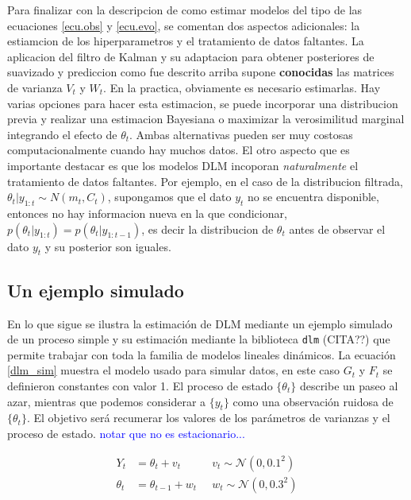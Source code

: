 \documentclass[12pt]{article}\usepackage[]{graphicx}\usepackage[]{color}
\begin{document}
Para finalizar con la descripcion de como estimar modelos del tipo de las ecuaciones \eqref{ecu.obs} y \eqref{ecu.evo}, se comentan dos aspectos adicionales: la estiamcion de los hiperparametros y el tratamiento de datos faltantes. La aplicacion del filtro de Kalman y su adaptacion para obtener posteriores de suavizado y prediccion como fue descrito arriba supone \textbf{conocidas} las matrices de varianza $V_t$ y $W_t$. En la practica, obviamente es necesario estimarlas. Hay varias opciones para hacer esta estimacion, se puede incorporar una distribucion previa y realizar una estimacion Bayesiana o maximizar la verosimilitud marginal integrando el efecto de $\theta_t$. Ambas alternativas pueden ser muy costosas computacionalmente cuando hay muchos datos. El otro aspecto que es importante destacar es que los modelos DLM incoporan \textit{naturalmente} el tratamiento de datos faltantes. Por ejemplo, en el caso de la distribucion filtrada, $\theta_t|y_{1:t} \sim N(m_t, C_t)$, supongamos que el dato $y_t$ no se encuentra disponible, entonces no hay informacion nueva en la que condicionar, $p(\theta_t|y_{1:t}) = p(\theta_t|y_{1:t-1})$, es decir la distribucion de $\theta_t$ antes de observar el dato $y_t$ y su posterior son iguales. 

 
\subsection{Un ejemplo simulado \label{implementacionR} }
En lo que sigue se ilustra la estimación de DLM mediante un ejemplo simulado de un proceso simple y su estimación mediante la biblioteca \verb|dlm| (CITA??) que permite trabajar con toda la familia de modelos lineales dinámicos. La ecuación \eqref{dlm_sim} muestra el modelo usado para simular datos,  en este caso $G_t$ y $F_t$ se definieron constantes con valor 1. El proceso de estado $\{\theta_t\}$ describe un paseo al azar, mientras que podemos considerar a $\{y_t\}$ como una observación ruidosa de $\{\theta_t\}$. El objetivo será recumerar los valores de los parámetros de varianzas y el proceso de estado. \textcolor{blue}{notar que no es estacionario...}

\begin{equation}
\begin{aligned}
Y_t&=\theta_t + v_t  \;&\;  v_t \sim \mathcal{N}(0,0.1^2) \\
\theta_t &= \theta_{t-1} + w_t \;&\; w_t \sim \mathcal{N}(0,0.3^2)
\end{aligned}
\label{dlm_sim}
\end{equation}
 
\end{document}
